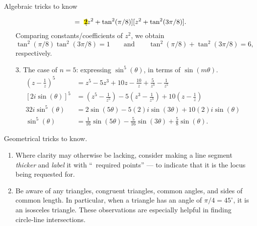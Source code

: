 \documentclass[oneside]{book}
\newcommand{\highlight}[2][red!50]{\mathpalette{\highlightwithstyle[#1]}{#2}}
\newcommand{\highlightwithstyle}[3][red!50]{
  \begingroup                         %
    \sbox0{$\mathsurround 0pt #2#3$}%
    \setlength{\fboxsep}{.5pt}        %
    \sbox2{\hspace{-.5pt}%
      \colorbox{#1}{\usebox0}%
    }%
    \dp2=\dp0 \ht2=\ht0 \wd2=\wd0     %
    \box2                             %
  \endgroup                           %
}
\begin{document}
\begin{example}{Algebraic tricks to know}{}
\begin{enumerate}
\begin{align*}
      &= \highlight[yellow]{2}[z^2+\tan^2(\pi/8)][z^2+\tan^2(3\pi/8)].
    \end{align*}
    Comparing constants/coefficients of \(z^2\), we obtain 
    \[\tan^2(\pi/8)\tan^2(3\pi/8)=1 \qquad\text{and}\qquad \tan^2(\pi/8)+\tan^2(3\pi/8)=6,\]
    respectively.  
    \item[3.] The case of \(n=5\): expressing \(\sin^5(\theta)\), in terms of \(\sin(m\theta)\).
    \begin{align*}
      \left( z-\frac{1}{z} \right)^5 &= z^5-5z^3+10z-\frac{10}{z}+\frac{5}{z^3}-\frac{1}{z^5}\\
      [2i\sin(\theta)]^5 &= \left( z^5-\frac{1}{z^5} \right)-5\left( z^3-\frac{1}{z^3} \right)+10\left( z-\frac{1}{z} \right)\\
      32i\sin^5(\theta) &= 2\sin(5\theta)-5(2)i\sin(3\theta)+10(2)i\sin(\theta)\\
      \sin^5(\theta) &= \frac{1}{16}\sin(5\theta)-\frac{5}{16}\sin(3\theta)+\frac{5}{8}\sin(\theta).
    \end{align*}
  \end{enumerate}
\end{example}
\begin{note}
  Geometrical tricks to know.
  \begin{enumerate}
    \item Where clarity may otherwise be lacking, consider making a line segment \emph{thicker} and \emph{label} it with ``\textrightarrow\ required points'' --- to indicate that it is the locus being requested for.  
    \item Be aware of any triangles, congruent triangles, common angles, and sides of common length. In particular, when a triangle has an angle of \(\pi/4=45^{\circ}\), it is an isosceles triangle. These observations are especially helpful in finding circle-line intersections.
  \end{enumerate}
\end{note}
\end{document}
